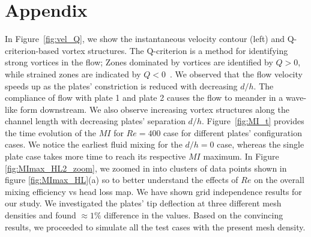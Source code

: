 \documentclass[reprint,a4paper,fleqn]{cas-dc} %
\begin{document}
		\section*{Appendix}
		
		In Figure~\ref{fig:vel_Q}, we show the instantaneous velocity contour (left) and Q-criterion-based vortex structures. The Q-criterion is a method for identifying strong vortices in the flow; Zones dominated by vortices are identified by $Q > 0$, while strained zones are indicated by $Q < 0$~\citep{Hunt1994, Hussain1995, Holmes2012, Rowley2014}. We observed that the flow velocity speeds up as the plates' constriction is reduced with decreasing $d/h$. The compliance of flow with plate 1 and plate 2 causes the flow to meander in a wave-like form downstream. We also observe increasing vortex structures along the channel length with decreasing plates' separation $d/h$.
		Figure~\ref{fig:MI_t} provides the time evolution of the $MI$ for $Re=400$ case for different plates' configuration cases. We notice the earliest fluid mixing for the $d/h=0$ case, whereas the single plate case takes more time to reach its respective $MI$ maximum.
		In Figure \ref{fig:MImax_HL2_zoom}, we zoomed in into clusters of data points shown in figure \ref{fig:MImax_HL}(a) so to better understand the effects of $Re$ on the overall mixing efficiency vs head loss map.
		We have shown grid independence results for our study. We investigated the plates' tip deflection at three different mesh densities and found $\approx1\%$ difference in the values. Based on the convincing results, we proceeded to simulate all the test cases with the present mesh density. 

		
		
\end{document}

